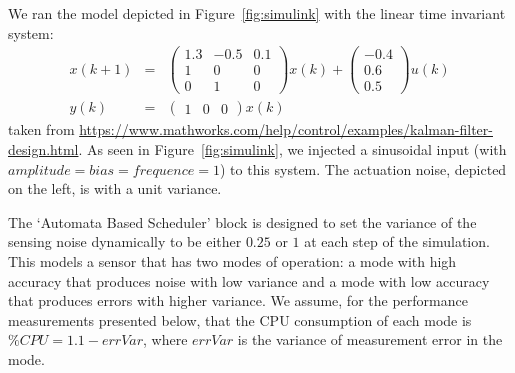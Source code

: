 \documentclass{sig-alternate-ipsn13}
\begin{document}
We ran the model depicted in Figure~\ref{fig:simulink} with the linear time invariant system:
\begin{eqnarray*}
x(k+1) &=& \begin{pmatrix}
	1.3  & -0.5  & 0.1 \\
	1    & 0     & 0 \\
	0    & 1     & 0
\end{pmatrix}x(k)+ 
\begin{pmatrix}
-0.4 \\
0.6\\
0.5\end{pmatrix} u(k) \\
y(k)&=& \begin{pmatrix}1 & 0 &0\end{pmatrix}x(k)
\end{eqnarray*}
taken from \url{https://www.mathworks.com/help/control/examples/kalman-filter-design.html}. As seen in Figure~\ref{fig:simulink}, we injected a sinusoidal input (with $amplitude=bias=frequence=1$) to this system. 
The actuation noise, depicted on the left, is with a unit variance. 

The `Automata Based Scheduler' block is designed to set the variance of the sensing noise dynamically to be either $0.25$ or $1$ at each step of the simulation. This models a sensor that has two modes of operation: a mode with high accuracy that produces noise with low variance and a mode with low accuracy that produces errors with higher variance. We assume, for the performance measurements presented below, that the CPU consumption of each mode is $\%CPU=1.1-errVar$, where $errVar$ is the variance of measurement error in the mode.
\end{document}
